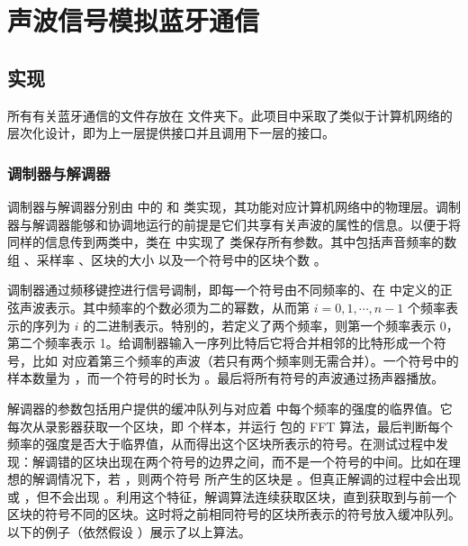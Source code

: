 \section{声波信号模拟蓝牙通信}

\subsection{实现}

所有有关蓝牙通信的文件存放在  文件夹下。此项目中采取了类似于计算机网络的层次化设计，即为上一层提供接口并且调用下一层的接口。

\subsubsection{调制器与解调器}

调制器与解调器分别由  中的  和  类实现，其功能对应计算机网络中的物理层。调制器与解调器能够和协调地运行的前提是它们共享有关声波的属性的信息。以便于将同样的信息传到两类中，类在  中实现了  类保存所有参数。其中包括声音频率的数组 、采样率 、区块的大小  以及一个符号中的区块个数 。

调制器通过频移键控进行信号调制，即每一个符号由不同频率的、在  中定义的正弦声波表示。其中频率的个数必须为二的幂数，从而第 $i = 0, 1,\cdots,n-1$ 个频率表示的序列为 $i$ 的二进制表示。特别的，若定义了两个频率，则第一个频率表示 0，第二个频率表示 1。给调制器输入一序列比特后它将合并相邻的比特形成一个符号，比如  对应着第三个频率的声波（若只有两个频率则无需合并）。一个符号中的样本数量为 ，而一个符号的时长为 。最后将所有符号的声波通过扬声器播放。

解调器的参数包括用户提供的缓冲队列与对应着  中每个频率的强度的临界值。它每次从录影器获取一个区块，即  个样本，并运行  包的 FFT 算法，最后判断每个频率的强度是否大于临界值，从而得出这个区块所表示的符号。在测试过程中发现：解调错的区块出现在两个符号的边界之间，而不是一个符号的中间。比如在理想的解调情况下，若 ，则两个符号  所产生的区块是 。但真正解调的过程中会出现  或 ，但不会出现 。利用这个特征，解调算法连续获取区块，直到获取到与前一个区块的符号不同的区块。这时将之前相同符号的区块所表示的符号放入缓冲队列。以下的例子（依然假设 ）展示了以上算法。

